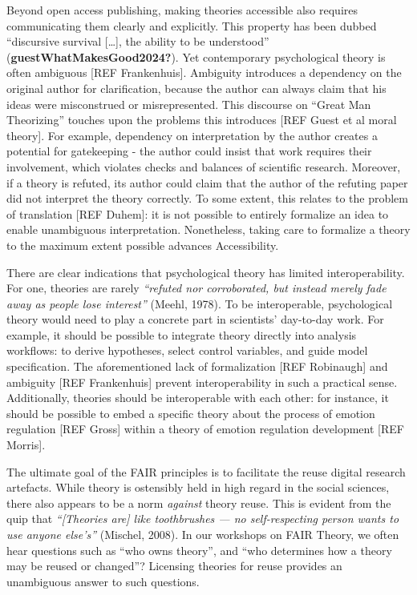 \documentclass[
  man]{apa6}
\begin{document}
Beyond open access publishing, making theories accessible also requires communicating them clearly and explicitly.
This property has been dubbed ``discursive survival {[}\ldots{]}, the ability to be understood'' (\textbf{guestWhatMakesGood2024?}).
Yet contemporary psychological theory is often ambiguous {[}REF Frankenhuis{]}.
Ambiguity introduces a dependency on the original author for clarification,
because the author can always claim that his ideas were misconstrued or misrepresented.
This discourse on ``Great Man Theorizing'' touches upon the problems this introduces {[}REF Guest et al moral theory{]}.
For example, dependency on interpretation by the author creates a potential for gatekeeping - the author could insist that work requires their involvement, which violates checks and balances of scientific research.
Moreover, if a theory is refuted, its author could claim that the author of the refuting paper did not interpret the theory correctly.
To some extent, this relates to the problem of translation {[}REF Duhem{]}:
it is not possible to entirely formalize an idea to enable unambiguous interpretation.
Nonetheless, taking care to formalize a theory to the maximum extent possible advances Accessibility.

There are clear indications that psychological theory has limited interoperability.
For one, theories are rarely \emph{``refuted nor corroborated, but instead merely fade away as people lose interest''} (Meehl, 1978).
To be interoperable, psychological theory would need to play a concrete part in scientists' day-to-day work.
For example, it should be possible to integrate theory directly into analysis workflows:
to derive hypotheses, select control variables, and guide model specification.
The aforementioned lack of formalization {[}REF Robinaugh{]} and ambiguity {[}REF Frankenhuis{]} prevent interoperability in such a practical sense.
Additionally, theories should be interoperable with each other:
for instance, it should be possible to embed a specific theory about the process of emotion regulation {[}REF Gross{]} within a theory of emotion regulation development {[}REF Morris{]}.

The ultimate goal of the FAIR principles is to facilitate the reuse digital research artefacts.
While theory is ostensibly held in high regard in the social sciences,
there also appears to be a norm \emph{against} theory reuse.
This is evident from the quip that
\emph{``{[}Theories are{]} like toothbrushes --- no self-respecting person wants to use anyone else's''} (Mischel, 2008).
In our workshops on FAIR Theory, we often hear questions such as ``who owns theory'',
and ``who determines how a theory may be reused or changed''?
Licensing theories for reuse provides an unambiguous answer to such questions.
\end{document}
